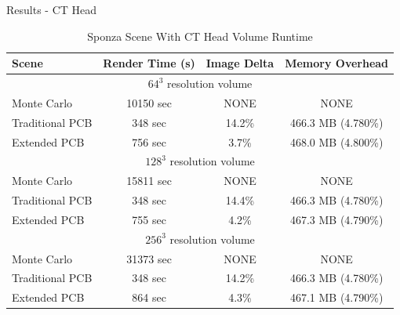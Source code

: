\documentclass[10pt,compress,professionalfont]{beamer}
\begin{document}
\begin{frame}{Results - CT Head}

    \begin{changemargin}{-4mm}{0cm}
        \begin{table}
        \begin{tabular}{ | l | c | c | c | }
          \hline                       
          Scene & Render Time (s) & Image Delta & Memory Overhead \\

          \hline
          \multicolumn{4}{|c|}{$64^3$ resolution volume} \\     
          \hline            

          Monte Carlo & 10150 sec & NONE & NONE \\
          Traditional PCB & 348 sec & 14.2\% & 466.3 MB (4.780\%) \\
          Extended PCB & 756 sec & 3.7\% & 468.0 MB (4.800\%)  \\

          \hline
          \multicolumn{4}{|c|}{$128^3$ resolution volume} \\     
          \hline            
                     
          Monte Carlo & 15811 sec & NONE & NONE \\
          Traditional PCB & 348 sec & 14.4\% & 466.3 MB (4.780\%) \\
          Extended PCB & 755 sec & 4.2\% & 467.3 MB (4.790\%)  \\

          \hline
          \multicolumn{4}{|c|}{$256^3$ resolution volume} \\     
          \hline            
                     
          Monte Carlo & 31373 sec & NONE & NONE \\
          Traditional PCB & 348 sec & 14.2\% & 466.3 MB (4.780\%) \\
          Extended PCB & 864 sec & 4.3\% & 467.1 MB (4.790\%)  \\
          \hline  
        \end{tabular}
        \caption{Sponza Scene With CT Head Volume Runtime}
        \end{table}
    \end{changemargin}

\end{frame}
\end{document}
